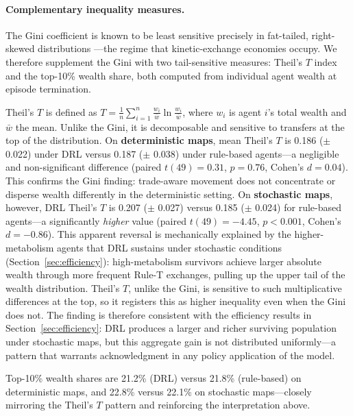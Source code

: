 \documentclass[pdflatex,sn-mathphys-num]{sn-jnl}%
\theoremstyle{thmstyleone}%
\theoremstyle{thmstyletwo}%
\theoremstyle{thmstylethree}%
\begin{document}
\paragraph{Complementary inequality measures.}
The Gini coefficient is known to be least sensitive precisely in fat-tailed, right-skewed distributions \citep{Atkinson1970}---the regime that kinetic-exchange economies occupy.
We therefore supplement the Gini with two tail-sensitive measures: Theil's $T$ index and the top-10\% wealth share, both computed from individual agent wealth at episode termination.

Theil's $T$ is defined as $T = \frac{1}{n}\sum_{i=1}^{n} \frac{w_i}{\bar{w}} \ln \frac{w_i}{\bar{w}}$, where $w_i$ is agent $i$'s total wealth and $\bar{w}$ the mean.
Unlike the Gini, it is decomposable and sensitive to transfers at the top of the distribution.
On \textbf{deterministic maps}, mean Theil's $T$ is 0.186 ($\pm$ 0.022) under DRL versus 0.187 ($\pm$ 0.038) under rule-based agents---a negligible and non-significant difference (paired $t(49) = 0.31$, $p = 0.76$, Cohen's $d = 0.04$).
This confirms the Gini finding: trade-aware movement does not concentrate or disperse wealth differently in the deterministic setting.
On \textbf{stochastic maps}, however, DRL Theil's $T$ is 0.207 ($\pm$ 0.027) versus 0.185 ($\pm$ 0.024) for rule-based agents---a significantly \emph{higher} value (paired $t(49) = -4.45$, $p < 0.001$, Cohen's $d = -0.86$).
This apparent reversal is mechanically explained by the higher-metabolism agents that DRL sustains under stochastic conditions (Section~\ref{sec:efficiency}): high-metabolism survivors achieve larger absolute wealth through more frequent Rule-T exchanges, pulling up the upper tail of the wealth distribution.
Theil's $T$, unlike the Gini, is sensitive to such multiplicative differences at the top, so it registers this as higher inequality even when the Gini does not.
The finding is therefore consistent with the efficiency results in Section~\ref{sec:efficiency}: DRL produces a larger and richer surviving population under stochastic maps, but this aggregate gain is not distributed uniformly---a pattern that warrants acknowledgment in any policy application of the model.

Top-10\% wealth shares are 21.2\% (DRL) versus 21.8\% (rule-based) on deterministic maps, and 22.8\% versus 22.1\% on stochastic maps---closely mirroring the Theil's $T$ pattern and reinforcing the interpretation above.
\end{document}
